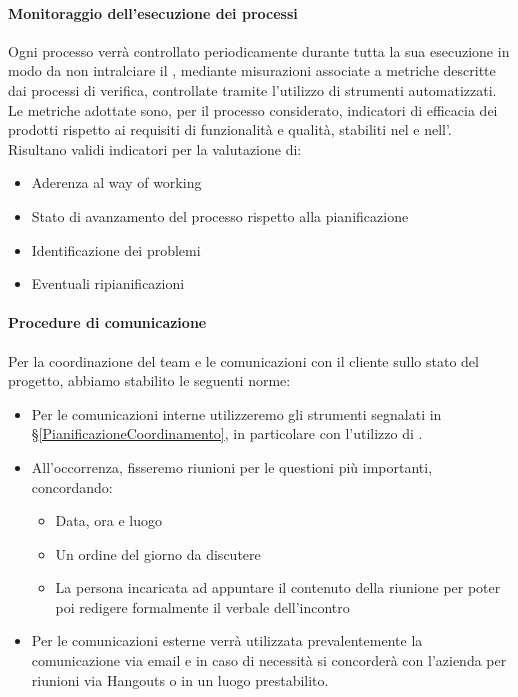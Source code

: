 			\paragraph{Monitoraggio dell'esecuzione dei processi}
			Ogni processo verrà controllato periodicamente durante tutta la sua esecuzione in modo da non intralciare il ,
			mediante misurazioni associate a metriche descritte dai processi di verifica, controllate tramite l'utilizzo di strumenti automatizzati.
			Le metriche adottate sono, per il processo considerato, indicatori di efficacia dei prodotti rispetto ai requisiti di funzionalità e qualità,
			stabiliti nel \Doc{\PdQv} e nell'\Doc{\AdRv}.\\
			Risultano validi indicatori per la valutazione di:
			\begin{itemize}
				\item Aderenza al way of working
				\item Stato di avanzamento del processo rispetto alla pianificazione
				\item Identificazione dei problemi
				\item Eventuali ripianificazioni
			\end{itemize}

			\paragraph{Procedure di comunicazione}
			Per la coordinazione del team e le comunicazioni con il cliente sullo stato del progetto, abbiamo stabilito le seguenti norme:
			\begin{itemize}
				\item Per le comunicazioni interne utilizzeremo gli strumenti segnalati in \S\ref{PianificazioneCoordinamento},
					in particolare con l'utilizzo di .
				\item All'occorrenza, fisseremo riunioni per le questioni più importanti, concordando:
					\begin{itemize}
						\item Data, ora e luogo
						\item Un ordine del giorno da discutere
						\item La persona incaricata ad appuntare il contenuto della riunione per poter poi redigere formalmente il verbale dell'incontro
					\end{itemize}
				\item Per le comunicazioni esterne verrà utilizzata prevalentemente la comunicazione via email e in caso di necessità si concorderà con
				l'azienda per riunioni via Hangouts o in un luogo prestabilito. %
			\end{itemize}


